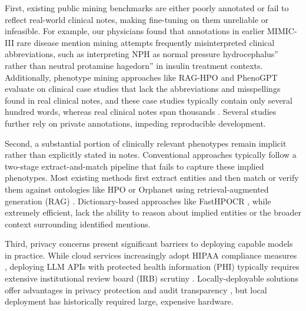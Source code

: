 First, existing public mining benchmarks are either poorly annotated or fail to reflect real-world clinical notes, making fine-tuning on them unreliable or infeasible. For example, our physicians found that annotations in earlier MIMIC-III rare disease mention mining attempts \cite{johnson2016mimic3, dong2023ontology_poor_annotations} frequently misinterpreted clinical abbreviations, such as interpreting NPH as normal pressure hydrocephalus'' rather than neutral protamine hagedorn'' in insulin treatment contexts. Additionally, phenotype mining approaches like RAG-HPO \cite{garcia2024_HPORAG} and PhenoGPT \cite{yang2023enhancingphenotyperecognitionclinical} evaluate on clinical case studies that lack the abbreviations and misspellings found in real clinical notes, and these case studies \cite{martinez2022raredis, yang2023enhancingphenotyperecognitionclinical} typically contain only several hundred words, whereas real clinical notes span thousands \cite{edin2023automated_medical_coding_survey, johnson2023mimic4_note}. Several studies \cite{wu2024hybrid, chen2024rarebenchllmsserverare} further rely on private annotations, impeding reproducible development. 

Second, a substantial portion of clinically relevant phenotypes remain implicit rather than explicitly stated in notes.  Conventional approaches typically follow a two-stage extract-and-match pipeline that fails to capture these implied phenotypes. Most existing methods \cite{garcia2024_HPORAG, wu2024hybrid, chen2024rarebenchllmsserverare} first extract entities and then match or verify them against ontologies like HPO \cite{gargano2024mode_hpo} or Orphanet \cite{weinreich2008orphanet} using retrieval-augmented generation (RAG) \cite{gao2024retrievalaugmentedgenerationlargelanguage_RAG_SURVEY}. Dictionary-based approaches \cite{deisseroth2019clinphen, liu2019doc2hpo, yadav2018survey_ner} like FastHPOCR \cite{groza2024fasthpocr}, while extremely efficient, lack the ability to reason about implied entities or the broader context surrounding identified mentions.

Third, privacy concerns present significant barriers to deploying capable models in practice. While cloud services increasingly adopt HIPAA compliance measures \cite{ayad2011addressing_hipaa_azure, keshetti2025designing_cloud_hipaa}, deploying LLM APIs with protected health information (PHI) typically requires extensive institutional review board (IRB) scrutiny \cite{grady2015institutional}. Locally-deployable solutions offer advantages in privacy protection and audit transparency \cite{sun2024activeprivacyauditingsupervised_whitebox_auditing}, but local deployment has historically required large, expensive hardware.

